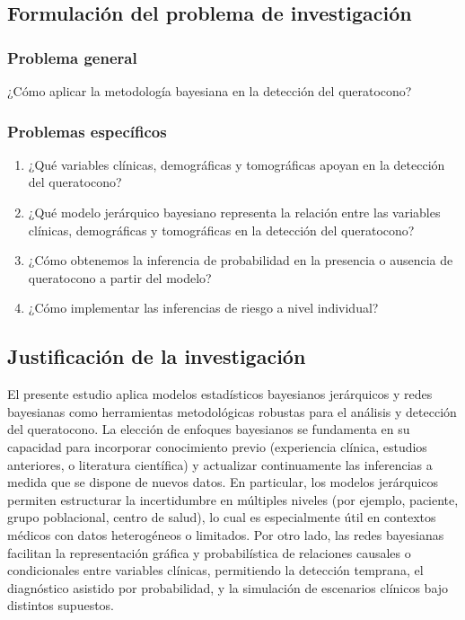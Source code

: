 \subsection{Formulación del problema de investigación}
\subsubsection{Problema general}
¿Cómo aplicar la metodología bayesiana en la detección del queratocono?

\subsubsection{Problemas específicos}
\begin{enumerate}
\item ¿Qué variables clínicas, demográficas y tomográficas apoyan en la detección del queratocono?
\item ¿Qué modelo jerárquico bayesiano representa la relación entre las variables clínicas, demográficas y tomográficas en la detección del queratocono?
\item ¿Cómo obtenemos la inferencia de probabilidad en la presencia o ausencia de queratocono a partir del modelo?
\item ¿Cómo implementar las inferencias de riesgo a nivel individual?
\end{enumerate}

\subsection{Justificación de la investigación}
El presente estudio aplica modelos estadísticos bayesianos jerárquicos y redes bayesianas como herramientas metodológicas robustas para el análisis y detección del queratocono. La elección de enfoques bayesianos se fundamenta en su capacidad para incorporar conocimiento previo (experiencia clínica, estudios anteriores, o literatura científica) y actualizar continuamente las inferencias a medida que se dispone de nuevos datos. En particular, los modelos jerárquicos permiten estructurar la incertidumbre en múltiples niveles (por ejemplo, paciente, grupo poblacional, centro de salud), lo cual es especialmente útil en contextos médicos con datos heterogéneos o limitados. Por otro lado, las redes bayesianas facilitan la representación gráfica y probabilística de relaciones causales o condicionales entre variables clínicas, permitiendo la detección temprana, el diagnóstico asistido por probabilidad, y la simulación de escenarios clínicos bajo distintos supuestos.

